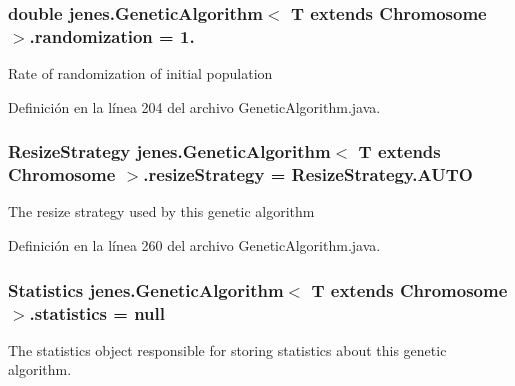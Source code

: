 \hypertarget{classjenes_1_1_genetic_algorithm_3_01_t_01extends_01_chromosome_01_4_adcb3e16398451c2e318de21d77b51d35}{
\subsubsection[{randomization}]{\setlength{\rightskip}{0pt plus 5cm}double jenes.\-Genetic\-Algorithm$<$ T extends Chromosome $>$.randomization = 1.\hspace{0.3cm}{\ttfamily [protected]}}}\label{classjenes_1_1_genetic_algorithm_3_01_t_01extends_01_chromosome_01_4_adcb3e16398451c2e318de21d77b51d35}
Rate of randomization of initial population 

Definición en la línea 204 del archivo Genetic\-Algorithm.\-java.

\hypertarget{classjenes_1_1_genetic_algorithm_3_01_t_01extends_01_chromosome_01_4_a56f08a1d1f3355921b83f08745dbb3b3}{
\subsubsection[{resize\-Strategy}]{\setlength{\rightskip}{0pt plus 5cm}Resize\-Strategy jenes.\-Genetic\-Algorithm$<$ T extends Chromosome $>$.resize\-Strategy = Resize\-Strategy.\-A\-U\-T\-O\hspace{0.3cm}{\ttfamily [protected]}}}\label{classjenes_1_1_genetic_algorithm_3_01_t_01extends_01_chromosome_01_4_a56f08a1d1f3355921b83f08745dbb3b3}
The resize strategy used by this genetic algorithm 

Definición en la línea 260 del archivo Genetic\-Algorithm.\-java.

\hypertarget{classjenes_1_1_genetic_algorithm_3_01_t_01extends_01_chromosome_01_4_afc23d5cbab5434f5ec5684cda9434b93}{
\subsubsection[{statistics}]{\setlength{\rightskip}{0pt plus 5cm}Statistics jenes.\-Genetic\-Algorithm$<$ T extends Chromosome $>$.statistics = null\hspace{0.3cm}{\ttfamily [protected]}}}\label{classjenes_1_1_genetic_algorithm_3_01_t_01extends_01_chromosome_01_4_afc23d5cbab5434f5ec5684cda9434b93}
The statistics object responsible for storing statistics about this genetic algorithm. 

